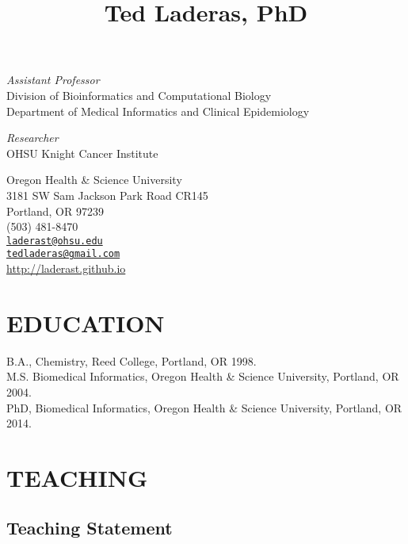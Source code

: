 \documentclass[11pt,]{article}
\title{Ted Laderas, PhD}
\author{}
\date{}
\begin{document}
\maketitle

\emph{Assistant Professor}\\
Division of Bioinformatics and Computational Biology\\
Department of Medical Informatics and Clinical Epidemiology

\emph{Researcher}\\
OHSU Knight Cancer Institute

Oregon Health \& Science University\\
3181 SW Sam Jackson Park Road CR145\\
Portland, OR 97239\\
(503) 481-8470\\
\href{mailto:laderast@ohsu.edu}{\nolinkurl{laderast@ohsu.edu}}\\
\href{mailto:tedladeras@gmail.com}{\nolinkurl{tedladeras@gmail.com}}\\
\url{http://laderast.github.io}

\section{EDUCATION}\label{education}

B.A., Chemistry, Reed College, Portland, OR \hfill 1998.\\
M.S. Biomedical Informatics, Oregon Health \& Science University,
Portland, OR \hfill 2004.\\
PhD, Biomedical Informatics, Oregon Health \& Science University,
Portland, OR \hfill 2014.

\section{TEACHING}\label{teaching}

\subsection{Teaching Statement}\label{teaching-statement}
\end{document}
